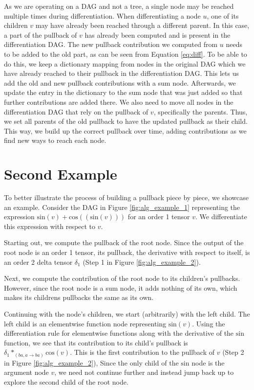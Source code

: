 \documentclass[12pt, a4paper]{report}
\begin{document}
As we are operating on a DAG and not a tree, a single node may be reached multiple times during differentiation.
When differentiating a node $u$, one of its children $v$ may have already been reached through a different parent.
In this case, a part of the pullback of $v$ has already been computed and is present in the differentiation DAG.
The new pullback contribution we computed from $u$ needs to be added to the old part, as can be seen from Equation \ref{eq:diff}.
To be able to do this, we keep a dictionary mapping from nodes in the original DAG which we have already reached to their pullback in the differentiation DAG.
This lets us add the old and new pullback contributions with a sum node.
Afterwards, we update the entry in the dictionary to the sum node that was just added so that further contributions are added there.
We also need to move all nodes in the differentiation DAG that rely on the pullback of $v$, specifically the parents.
Thus, we set all parents of the old pullback to have the updated pullback as their child.
This way, we build up the correct pullback over time, adding contributions as we find new ways to reach each node.

\FloatBarrier
\section{Second Example}
To better illustrate the process of building a pullback piece by piece, we showcase an example.
Consider the DAG in Figure \ref{fig:alg_example_1} representing the expression $\text{sin}(v) + \text{cos}((\text{sin}(v)))$ for an order 1 tensor $v$.
We differentiate this expression with respect to $v$.

Starting out, we compute the pullback of the root node.
Since the output of the root node is an order 1 tensor, its pullback, the derivative with respect to itself, is an order 2 delta tensor $\delta_1$ (Step 1 in Figure \ref{fig:alg_example_2}).

Next, we compute the contribution of the root node to its children's pullbacks.
However, since the root node is a sum node, it adds nothing of its own, which makes its childrens pullbacks the same as its own.

Continuing with the node's children, we start (arbitrarily) with the left child.
The left child is an elementwise function node representing $\text{sin}(v)$.
Using the differentiation rule for elementwise functions along with the derivative of the $\text{sin}$ function, we see that its contribution to its child's pullback is $\delta_1 *_{(ba,a \rightarrow ba)} \text{cos}(v)$.
This is the first contribution to the pullback of $v$ (Step 2 in Figure \ref{fig:alg_example_2}),
Since the only child of the $\text{sin}$ node is the argument node $v$, we need not continue further and instead jump back up to explore the second child of the root node.
\end{document}
